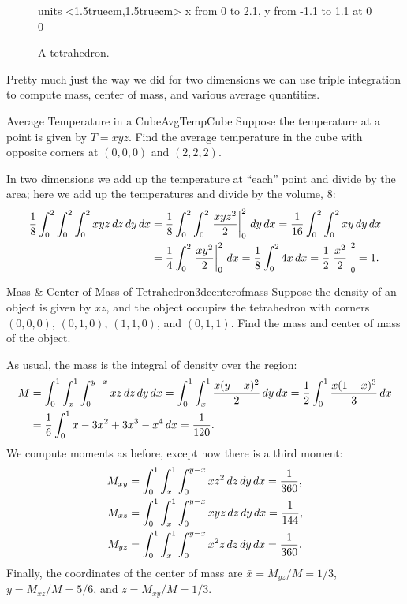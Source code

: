 \begin{figure}[H]
\centerline{
\vbox{\beginpicture
\normalgraphs
\setcoordinatesystem units <1.5truecm,1.5truecm>
\setplotarea x from 0 to 2.1, y from -1.1 to 1.1
 at 0 0
\endpicture}}
\caption{A tetrahedron.}
\label{fig:tetrahedron}
\end{figure}

Pretty much just the way we did for two dimensions we can use triple
integration to compute mass, center of mass, and various average quantities.

\begin{example}{Average Temperature in a Cube}{AvgTempCube}
Suppose the temperature at a point is given by
$T=xyz$. Find the average temperature in the cube with opposite
corners at $(0,0,0)$ and $(2,2,2)$.
\end{example}
\begin{solution}
In two dimensions we add up the temperature at ``each'' point and
divide by the area; here we add up the temperatures and divide by the
volume, $8$:
\begin{align*}
{1\over8}\int_{0}^2\int_{0}^2\int_{0}^2 xyz\,dz\,dy\,dx
&={1\over8}\int_{0}^2\int_{0}^2\left.{xyz^2\over2}\right|_0^2\,dy\,dx
={1\over16}\int_{0}^2\int_{0}^2 xy\,dy\,dx	\\
&={1\over4}\int_{0}^2\left.{xy^2\over2}\right|_0^2\,dx
={1\over8}\int_{0}^2 4x\,dx
={1\over2}\left.{x^2\over2}\right|_0^2
=1.
\end{align*}
\end{solution}

\begin{example}{Mass \& Center of Mass of Tetrahedron}{3dcenterofmass}
Suppose the density of an object is given by $xz$, and the
object occupies the tetrahedron with corners
$(0,0,0)$, $(0,1,0)$, $(1,1,0)$, and $(0,1,1)$. Find the mass and
center of mass of the object.
\end{example}
\begin{solution}
As usual, the mass is the integral of density over the region:
\begin{align*}
M&=\int_{0}^1\int_{x}^1\int_{0}^{y-x} xz\,dz\,dy\,dx
=\int_{0}^1\int_{x}^1 {x(y-x)^2\over2}\,dy\,dx
={1\over2}\int_{0}^1 {x(1-x)^3\over3}\,dx	\\
&={1\over6}\int_{0}^1 x-3x^2+3x^3-x^4\,dx
={1\over120}.
\end{align*}
We compute moments as before, except now there is a third moment:
\begin{align*}
M_{xy} &= \int_{0}^1\int_{x}^1\int_{0}^{y-x} xz^2\,dz\,dy\,dx
={1\over360},	\\
M_{xz} &= \int_{0}^1\int_{x}^1\int_{0}^{y-x} xyz\,dz\,dy\,dx
={1\over144},	\\
M_{yz} &= \int_{0}^1\int_{x}^1\int_{0}^{y-x} x^2z\,dz\,dy\,dx
={1\over360}.
\end{align*}
Finally, the coordinates of the center of mass are
$\bar x=M_{yz}/M=1/3$, $\bar y=M_{xz}/M=5/6$, and  $\bar
z=M_{xy}/M=1/3$.
\end{solution}


